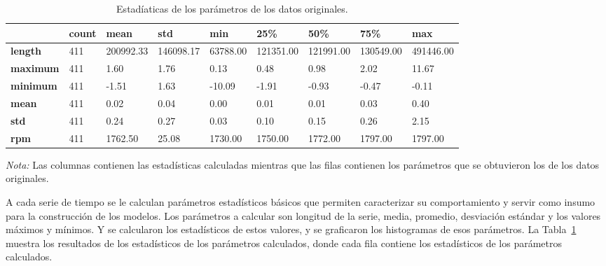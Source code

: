 \documentclass[11pt,a4paper,spanish]{book}
\numberwithin{equation}{chapter}
\numberwithin{figure}{chapter}
\begin{document}
\begin{table}[h]
\caption{Estadíaticas de los parámetros de los datos originales.}
\centering
\renewcommand{\arraystretch}{1.2}
\footnotesize
\begin{tabularx}{\textwidth}{|l|X|X|X|X|X|X|X|X|}
    \hline
    \textbf{ } & \textbf{count} & \textbf{mean} & \textbf{std} & \textbf{min} & \textbf{25\%} & \textbf{50\%} & \textbf{75\%} & \textbf{max} \\
    \hline
    \textbf{length} & 411 & 200992.33 & 146098.17 & 63788.00 & 121351.00 & 121991.00 & 130549.00 & 491446.00 \\
    \hline
    \textbf{maximum} & 411 & 1.60 & 1.76 & 0.13 & 0.48 & 0.98 & 2.02 & 11.67 \\
    \hline
    \textbf{minimum} & 411 & -1.51 & 1.63 & -10.09 & -1.91 & -0.93 & -0.47 & -0.11 \\
    \hline
    \textbf{mean} & 411 & 0.02 & 0.04 & 0.00 & 0.01 & 0.01 & 0.03 & 0.40 \\
    \hline
    \textbf{std} & 411 & 0.24 & 0.27 & 0.03 & 0.10 & 0.15 & 0.26 & 2.15 \\
    \hline
    \textbf{rpm} & 411 & 1762.50 & 25.08 & 1730.00 & 1750.00 & 1772.00 & 1797.00 & 1797.00 \\
    \hline
\end{tabularx}
\label{tab:stats}
\vspace{2mm}
\parbox{\textwidth}{\footnotesize \textit{Nota:} Las columnas contienen las estadísticas calculadas mientras que las filas contienen los parámetros que se obtuvieron los de los datos originales.}
\end{table}



A cada serie de tiempo se le calculan parámetros estadísticos básicos que permiten 
caracterizar su comportamiento y servir como insumo para la construcción de los modelos. 
Los parámetros a calcular son longitud de la serie, media, promedio, desviación estándar 
y los valores máximos y mínimos. Y se calcularon los estadísticos de estos valores, y se 
graficaron los histogramas de esos parámetros. La Tabla~\ref{tab:stats} muestra los 
resultados de los estadísticos de los parámetros calculados, donde cada fila contiene 
los estadísticos de los parámetros calculados. 
\end{document}
